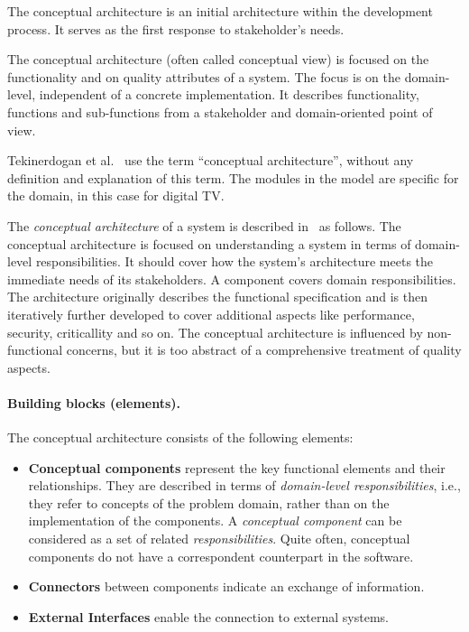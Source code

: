 \documentclass{llncs} %
\newcommand{\ggr}[1]{\textcolor{magenta}{comment Gerd: \textit{#1}}}
\begin{document}
The conceptual architecture is an initial architecture within the development process.
It serves as the first response to stakeholder's needs.

The conceptual architecture (often called conceptual view) is focused
on the functionality and on quality attributes of a system. The focus is on the domain-level,
independent of a concrete implementation.
It describes functionality, functions and sub-functions from a stakeholder and domain-oriented
point of view.

Tekinerdogan et al.~\cite{Tekinerdogan2008SAR} use the term ``conceptual architecture'',
without any definition and explanation of this term. The modules in the model are specific for the domain,
in this case for digital TV.


The \emph{conceptual architecture} of a system is described in~\cite{Reekie2006ASA} as follows.
The conceptual architecture is focused on understanding a system in terms of
domain-level responsibilities. It should cover how the system's architecture meets
the immediate needs of its stakeholders.
A component covers domain responsibilities. 
The architecture originally describes the functional specification
and is then iteratively further developed to cover additional aspects like performance, security,
criticallity and so on.
The conceptual architecture is influenced by non-functional concerns,
but it is too abstract of a comprehensive treatment of quality aspects.

\paragraph{Building blocks (elements).}

The conceptual architecture consists of the following elements:
\begin{itemize}
	\item \textbf{Conceptual components} represent the key functional elements and their relationships.
	They are described in terms of \emph{domain-level responsibilities}, i.e., they refer to
	concepts of the problem domain, rather than on the implementation of the components.
	A \emph{conceptual component} can be considered as a set of related \emph{responsibilities}.
	Quite often, conceptual components do not have a correspondent counterpart in the software.
	\item \textbf{Connectors} between components indicate an exchange of information.
	\item \textbf{External Interfaces} enable the connection to external systems. 
\end{itemize}
\end{document}
